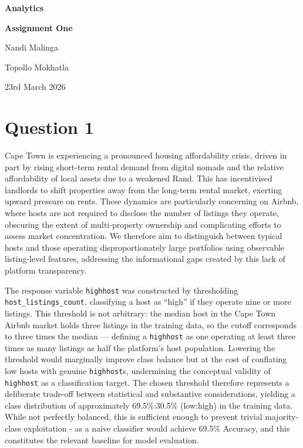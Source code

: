 \documentclass[11pt]{article}\usepackage[]{graphicx}\usepackage[]{xcolor}
\begin{document}
\begin{titlepage}
    \centering
    \vspace*{2cm}
    
    {\Huge\bfseries Analytics \par}
    \vspace{2cm}
    
    {\LARGE\bfseries Assignment One\par}
    \vspace{2cm}
    
    {\LARGE Nandi Malinga\par}
    \vspace{0.2cm}
    
    {\LARGE Topollo Mokhatla\par}
    \vspace{3cm}
    
    {\large 23rd March 2026\par}
\end{titlepage}

\section*{Question 1}
Cape Town is experiencing a pronounced housing affordability crisis, driven in part by 
rising short-term rental demand from digital nomads and the relative affordability of 
local assets due to a weakened Rand\citep{Moodley2025}. This has 
incentivised landlords to shift properties away from the long-term rental market, 
exerting upward pressure on rents\citep{Moodley2025}. These dynamics 
are particularly concerning on Airbnb, where hosts are not required to disclose the 
number of listings they operate, obscuring the extent of multi-property ownership and 
complicating efforts to assess market concentration. 
We therefore aim to distinguish between typical hosts and those operating 
disproportionately large portfolios using observable listing-level features, addressing 
the informational gaps created by this lack of platform transparency.


The response variable \texttt{highhost} was constructed by thresholding 
\texttt{host\_listings\_count}, classifying a host as ``high'' if they operate nine or 
more listings. This threshold is not arbitrary: the median host in the Cape Town Airbnb 
market holds three listings in the training data, so the cutoff corresponds to three times 
the median — defining a \texttt{highhost} as one operating at least three times as many 
listings as half the platform's host population. Lowering the threshold would marginally 
improve class balance but at the cost of conflating low hosts with genuine \texttt{highhost}s, undermining the conceptual validity of \texttt{highhost} 
as a classification target. The chosen threshold therefore represents a deliberate 
trade-off between statistical and substantive considerations, yielding a class distribution 
of approximately 69.5\%:30.5\% (low:high) in the training data. While not perfectly 
balanced, this is sufficient enough to prevent trivial majority-class exploitation
- as a naive classifier would achieve 69.5\% Accuracy, and this constitutes the relevant 
baseline for model evaluation.
\end{document}
